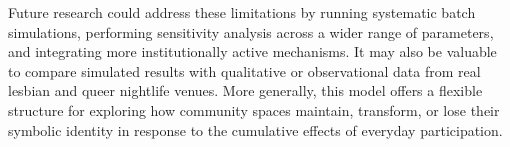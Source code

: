 \documentclass{article}
\begin{document}
Future research could address these limitations by running systematic batch simulations, performing sensitivity analysis across a wider range of parameters, and integrating more institutionally active mechanisms. It may also be valuable to compare simulated results with qualitative or observational data from real lesbian and queer nightlife venues. More generally, this model offers a flexible structure for exploring how community spaces maintain, transform, or lose their symbolic identity in response to the cumulative effects of everyday participation.

 
   
\end{document}

